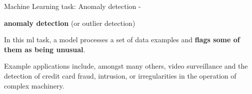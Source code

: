
\begin{frame}[t,allowframebreaks]{
    Machine Learning task: Anomaly detection - }

    {\bf {}\Gls{anomaly detection}} 
    (or \gls{outlier detection})\\
    \vspace{0.1cm}
    \begin{itemize}
        {
            \item
            In this \gls{ml} task, a model processes a set of data examples
            and {\bf flags some of them as being unusual}.
            \vspace{0.1cm}
            \item
            Example applications include, amongst many others,
            video surveillance and the detection of 
            credit card fraud, 
            intrusion, or 
            irregularities in the operation of complex machinery.
        }
    \end{itemize}

\end{frame}